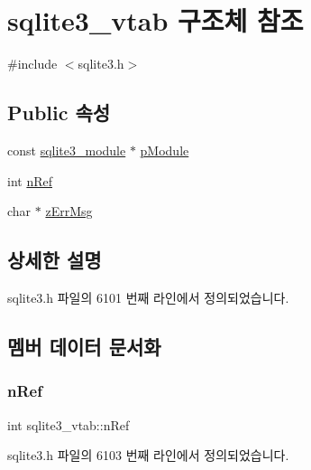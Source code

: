 \hypertarget{structsqlite3__vtab}{}\section{sqlite3\+\_\+vtab 구조체 참조}
\label{structsqlite3__vtab}


{\ttfamily \#include $<$sqlite3.\+h$>$}

\subsection*{Public 속성}
\begin{DoxyCompactItemize}
\item 
const \hyperlink{structsqlite3__module}{sqlite3\+\_\+module} $\ast$ \hyperlink{structsqlite3__vtab_a4ef8198ca611b73a9b23054dd1e91e2b}{p\+Module}
\item 
int \hyperlink{structsqlite3__vtab_ab3c80d385849bdd82363a0df7d6fcba8}{n\+Ref}
\item 
char $\ast$ \hyperlink{structsqlite3__vtab_afc50eadfdd7cef876633d460deba48d6}{z\+Err\+Msg}
\end{DoxyCompactItemize}


\subsection{상세한 설명}


sqlite3.\+h 파일의 6101 번째 라인에서 정의되었습니다.



\subsection{멤버 데이터 문서화}
\mbox{\label{structsqlite3__vtab_ab3c80d385849bdd82363a0df7d6fcba8}} 
\subsubsection{\texorpdfstring{n\+Ref}{nRef}}
{\footnotesize\ttfamily int sqlite3\+\_\+vtab\+::n\+Ref}



sqlite3.\+h 파일의 6103 번째 라인에서 정의되었습니다.

\mbox{\label{structsqlite3__vtab_a4ef8198ca611b73a9b23054dd1e91e2b}} 
